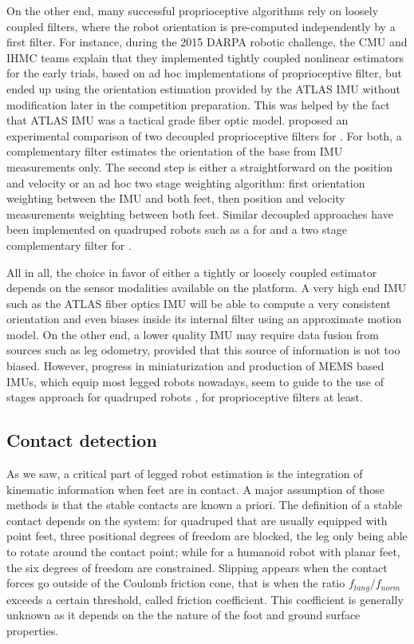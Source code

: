 On the other end, many successful proprioceptive algorithms rely on loosely coupled filters, where the robot orientation is pre-computed
independently by a first filter. For instance, during the 2015 DARPA robotic challenge, the CMU \cite{feng2015optimization} and IHMC 
\cite{johnson2015team} teams explain that they implemented tightly coupled nonlinear estimators for the early trials, based on ad hoc 
implementations of proprioceptive filter, but ended up using the orientation estimation provided by the ATLAS IMU without modification later in the competition preparation.
This was helped by the fact that ATLAS IMU was a tactical grade fiber optic model. 
\cite{flayols2017experimental} proposed an experimental comparison of two decoupled proprioceptive filters for . For both, a complementary filter estimates 
the orientation of the base from IMU measurements only. The second step is either a straightforward \KalmanF on the position and velocity or an ad hoc two stage 
weighting algorithm: first orientation weighting between the IMU and both feet, then position and velocity measurements 
weighting between both feet. Similar decoupled approaches have been implemented on quadruped robots such as a \KalmanF for \cite{bledt2018cheetah} and a two 
stage complementary filter for \cite{leziart2021implementation}.

All in all, the choice in favor of either a tightly or loosely coupled estimator depends on the sensor modalities available on the platform. A very high end IMU such as the ATLAS fiber optics
IMU will be able to compute a very consistent orientation and even biases inside its internal filter using an approximate motion model. On the other end,
a lower quality IMU may require data fusion from sources such as leg odometry, provided that this source of information is not too biased. However, progress in 
miniaturization and production of MEMS based IMUs, which equip most legged robots nowadays, seem to guide to the use of stages approach for quadruped robots \cite{bledt2018cheetah, leziart2021implementation},
for proprioceptive filters at least.


\subsection{Contact detection}
As we saw, a critical part of legged robot estimation is the integration of kinematic information when feet are in contact. A major
assumption of those methods is that the stable contacts are known a priori. The definition of a stable contact depends on the system: for quadruped that 
are usually equipped with point feet, three positional degrees of freedom are blocked, the leg only being able to rotate around the contact point; 
while for a humanoid robot with planar feet, the six degrees of freedom are constrained. Slipping appears when the contact forces go outside of the Coulomb friction cone, 
that is when the ratio $f_{tang}/f_{norm}$ exceeds a certain threshold, called friction coefficient. 
This coefficient is generally unknown as it depends on the the nature of the foot and ground surface properties.

